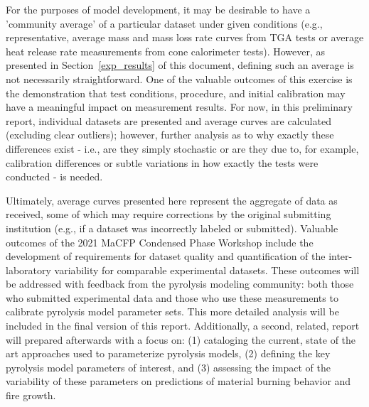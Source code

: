 \documentclass{book}
\begin{document}
For the purposes of model development, it may be desirable to have a 'community average' of a particular dataset under given conditions (e.g., representative, average mass and mass loss rate curves from TGA tests or average heat release rate measurements from cone calorimeter tests). However, as presented in Section~\ref{exp_results} of this document, defining such an average is not necessarily straightforward. One of the valuable outcomes of this exercise is the demonstration that test conditions, procedure, and initial calibration may have a meaningful impact on measurement results. For now, in this preliminary report, individual datasets are presented and average curves are calculated (excluding clear outliers); however, further analysis as to why exactly these differences exist - i.e., are they simply stochastic or are they due to, for example, calibration differences or subtle variations in how exactly the tests were conducted - is needed.

Ultimately, average curves presented here represent the aggregate of data as received, some of which may require corrections by the original submitting institution (e.g., if a dataset was incorrectly labeled or submitted). Valuable outcomes of the 2021 MaCFP Condensed Phase Workshop include the development of requirements for dataset quality and quantification of the inter-laboratory variability for comparable experimental datasets. These outcomes will be addressed with feedback from the pyrolysis modeling community: both those who submitted experimental data and those who use these measurements to calibrate pyrolysis model parameter sets. This more detailed analysis will be included in the final version of this report. Additionally, a second, related, report will prepared afterwards with a focus on: (1) cataloging the current, state of the art approaches used to parameterize pyrolysis models, (2) defining the key pyrolysis model parameters of interest, and (3) assessing the impact of the variability of these parameters on predictions of material burning behavior and fire growth.



\appendix

\end{document}
